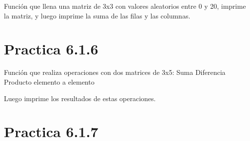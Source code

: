 \documentclass[letterpaper,10pt,spanish]{sphinxmanual}
\begin{document}
\begin{fulllineitems}
\label{\detokenize{pr6:pr6.1_5.llenar_y_sumar_matriz}}
\pysigstartsignatures
{}
\pysigstopsignatures
\sphinxAtStartPar
Función que llena una matriz de 3x3 con valores aleatorios entre 0 y 20,
imprime la matriz, y luego imprime la suma de las filas y las columnas.

\end{fulllineitems}



\section{Practica 6.1.6}
\label{\detokenize{pr6:module-pr6.1_6}}\label{\detokenize{pr6:practica-6-1-6}}

\begin{fulllineitems}
\label{\detokenize{pr6:pr6.1_6.operaciones_matrices}}
\pysigstartsignatures
{}
\pysigstopsignatures
\sphinxAtStartPar
Función que realiza operaciones con dos matrices de 3x5:
\sphinxhyphen{} Suma
\sphinxhyphen{} Diferencia
\sphinxhyphen{} Producto elemento a elemento

\sphinxAtStartPar
Luego imprime los resultados de estas operaciones.

\end{fulllineitems}



\section{Practica 6.1.7}
\label{\detokenize{pr6:module-pr6.1_7}}\label{\detokenize{pr6:practica-6-1-7}}
\end{document}
